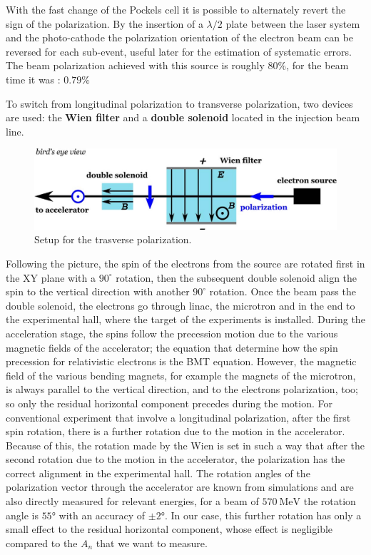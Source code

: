 With the fast change of the Pockels cell it is possible to alternately revert the sign of the polarization. By the insertion of a $\lambda/2$ plate between the laser system and the photo-cathode the polarization orientation of the electron beam can be reversed for each sub-event, useful later for the estimation of systematic errors. The beam polarization achieved with this source is roughly $80 \% $, for the beam time it was : $0.79 \% $

To switch from longitudinal polarization to transverse polarization, two devices are used: the \textbf{Wien filter} and a \textbf{double solenoid} located in the injection beam line. 

\begin{figure}[hbtp]
\centering
\includegraphics[width = \textwidth]{ExperimentalSetup/injection.png}
\caption{Setup for the trasverse polarization.}
\end{figure}

Following the picture, the spin of the electrons from the source are rotated first in the XY plane with a $90^{\circ}$ rotation, then the subsequent double solenoid align the spin to the vertical direction with another $90^{\circ}$ rotation. 
Once the beam pass the double solenoid, the electrons go through linac, the microtron and in the end to the experimental hall, where the target of the experiments is installed. During the acceleration stage, the spins follow the precession motion due to the various magnetic fields of the accelerator; the equation that determine how the spin precession for relativistic electrons is the BMT equation.
However, the magnetic field of the various bending magnets, for example the magnets of the microtron, is always parallel to the vertical direction, and to the electrons polarization, too; so only the residual horizontal component precedes during the motion. For conventional experiment that involve a longitudinal polarization, after the first spin rotation, there is a further rotation due to the motion in the accelerator. Because of this, the rotation made by the Wien is set in such a way that after the second rotation due to the motion in the accelerator, the polarization has the correct alignment in the experimental hall. The rotation angles of the polarization vector through the accelerator are known from simulations and are also directly measured for relevant energies, for a beam of $\SI{570}{\mega \electronvolt}$ the rotation angle is $\ang{55}$ with an accuracy of $\pm \ang{2}$. In our case, this further rotation has only a small effect to the residual horizontal component, whose effect is negligible compared to the $A_{n}$ that we want to measure.

